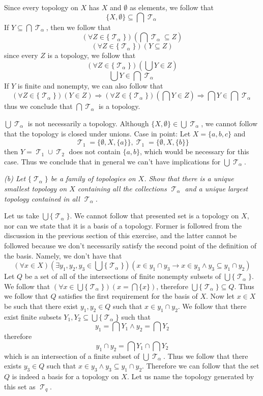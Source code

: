 \documentclass[11pt,oneside,titlepage]{book}
\DeclareMathOperator \topol {\mathcal {T}}
\DeclareMathOperator \ra {\Rightarrow}
\newcommand{\set}[1]{\{ #1 \}}
\begin{document}
Since every topology on $X$ has $X$ and $\emptyset$ as elements, we follow that
$$\{X, \emptyset\} \subseteq \bigcap{\topol_\alpha}$$
If $Y \subseteq \bigcap{\topol_\alpha}$, then we follow that
$$(\forall Z \in \{\topol_\alpha\})(\bigcap{\topol_\alpha} \subseteq Z)$$
$$(\forall Z \in \{\topol_\alpha\})(Y \subseteq Z)$$
since every $Z$ is a topology, we follow that
$$(\forall Z \in \{\topol_\alpha\})(\bigcup{Y} \in Z)$$
$$\bigcup{Y} \in \bigcap{\topol_\alpha}$$
If $Y$ is finite and nonempty, we can also follow that
$$(\forall Z \in \{\topol_\alpha\})(Y \in Z) \ra
(\forall Z \in \{\topol_\alpha\})(\bigcap{Y} \in Z) \ra \bigcap{Y} \in \bigcap{\topol_\alpha}$$
thus we conclude that $\bigcap{\topol_\alpha}$ is a topology.

$\bigcup{\topol_\alpha}$ is not necessarily a topology. Although
$\set{X, \emptyset} \in \bigcup{\topol_\alpha}$, we cannot follow that the topology is
closed under unions. Case in point: Let $X = \set{a, b, c}$ and
$$\topol_1 = \set{\emptyset, X, \set{a}}, \topol_1 = \set{\emptyset, X, \set{b}}$$
then $Y = \topol_1 \cup \topol_2$ does not contain $\set{a, b}$, which would be necessary
for this case. Thus we conclude that in general we can't have implications for
$\bigcup{\topol_\alpha}$.

\textit{(b) Let $\set{\topol_\alpha}$ be a family of topologies on $X$. Show that there is a
  unique smallest topology on $X$ containing all the collections $\topol_\alpha$ and
  a unique largest topology contained in all $\topol_\alpha$.}

Let us take $\bigcup{\set{\topol_\alpha}}$. We cannot follow that presented
set is a topology on $X$, nor can we state that it is a basis of a topology. Former
is followed from the discussion in the previous section of this exercise, and the latter
cannot be followed because we don't necessarily satisfy the
second point of the definition of the basis. Namely, we don't have that
$$(\forall x \in X)(\exists y_1, y_2, y_3 \in \bigcup{\set{\topol_\alpha}})(x \in y_1 \cap y_3 \to
x \in y_3 \land y_3 \subseteq y_1 \cap y_2)$$
Let $Q$ be a set of all of the intersections of finite nonempty subsets of
$\bigcup{\set{\topol_\alpha}}$. We follow that $(\forall x \in \bigcup{\set{\topol_\alpha}})
(x = \bigcap{\{x\}})$, therefore $\bigcup{\set{\topol_\alpha}} \subseteq Q$. 
Thus we follow that $Q$ satisfies
the first requirement for the basis of $X$. Now let $x \in X$ be such that there
exist $y_1, y_2 \in Q$ such that $x \in y_1 \cap y_2$. We follow that there exist
finite subsets $Y_1, Y_2 \subseteq \bigcup{\set{\topol_\alpha}}$ such that 
$$y_1 = \bigcap{Y_1} \land y_2 = \bigcap{Y_2}$$
therefore
$$y_1 \cap y_2  = \bigcap{Y_1} \cap \bigcap{Y_2}$$
which is an intersection of a finite subset of $\bigcup{\topol_\alpha}$. Thus we follow that there
exists $y_3 \in Q$ such that $x \in y_3 \land y_3 \subseteq y_1 \cap y_2$. 
Therefore we can follow that the set $Q$ is indeed a basis for a topology on $X$.
Let us name the topology generated by this set as $\topol_q$.
\end{document}
